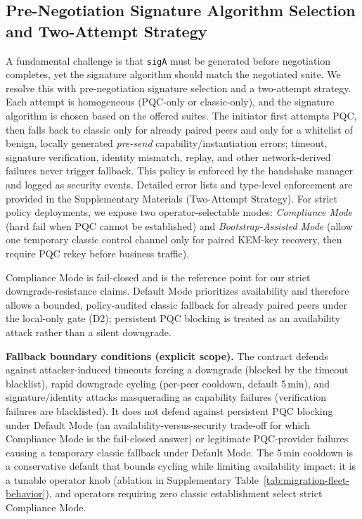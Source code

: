 \documentclass[10pt,journal,compsoc]{IEEEtran}
\begin{document}
\subsection{Pre-Negotiation Signature Algorithm Selection and
Two-Attempt
Strategy}\label{g.-pre-negotiation-signature-algorithm-selection-and-two-attempt-strategy}

A fundamental challenge is that \texttt{sigA} must be generated before
negotiation completes, yet the signature algorithm should match the
negotiated suite. We resolve this with pre-negotiation signature
selection and a two-attempt strategy. Each attempt is homogeneous
(PQC-only or classic-only), and the signature algorithm is chosen based
on the offered suites. The initiator first attempts PQC, then falls back
to classic only for already paired peers and only for a whitelist of
benign, locally generated \emph{pre-send} capability/instantiation
errors; timeout, signature
verification, identity mismatch, replay, and other network-derived
failures never trigger fallback. This policy is enforced by the
handshake manager and logged as security events. Detailed error lists
and type-level enforcement are provided in the Supplementary Materials
(Two-Attempt Strategy).
For strict policy deployments, we expose two operator-selectable modes:
\emph{Compliance Mode} (hard fail when PQC cannot be established) and
\emph{Bootstrap-Assisted Mode} (allow one temporary classic control
channel only for paired KEM-key recovery, then require PQC rekey before
business traffic).

Compliance Mode is fail-closed and is the reference point for our strict
downgrade-resistance claims. Default Mode prioritizes availability and
therefore allows a bounded, policy-audited classic fallback for already
paired peers under the local-only gate (D2); persistent PQC blocking is
treated as an availability attack rather than a silent downgrade.

\textbf{Fallback boundary conditions (explicit scope).} The contract
defends against attacker-induced timeouts forcing a downgrade (blocked by
the timeout blacklist), rapid downgrade cycling (per-peer cooldown,
default 5\,min), and signature/identity attacks masquerading as
capability failures (verification failures are blacklisted). It does not
defend against persistent PQC blocking under Default Mode (an
availability-versus-security trade-off for which Compliance Mode is the
fail-closed answer) or legitimate PQC-provider failures causing a
temporary classic fallback under Default Mode. The 5\,min cooldown is a
conservative default that bounds cycling while limiting availability
impact; it is a tunable operator knob (ablation in Supplementary
Table~\ref{tab:migration-fleet-behavior}), and operators requiring zero
classic establishment select strict Compliance Mode.
\end{document}
